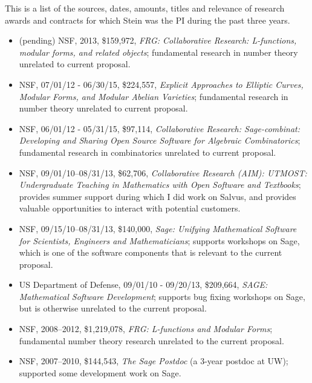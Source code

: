 \documentclass[11pt]{article}
\begin{document}
\mbox{}

This is a list of the sources, dates, amounts, titles and relevance of
research awards and contracts for which Stein was the PI during the
past three years.

\begin{itemize}\setlength{\itemsep}{0ex}

\item (pending) NSF, 2013, \$159,972, {\em FRG: Collaborative Research: L-functions, modular forms, and related objects}; fundamental research in number theory unrelated to current proposal.

\item NSF, 07/01/12 - 06/30/15, \$224,557, {\em Explicit Approaches to Elliptic Curves, Modular Forms, and Modular Abelian Varieties}; fundamental research in number theory unrelated to current proposal.
\item NSF, 06/01/12 - 05/31/15, \$97,114, {\em Collaborative Research: Sage-combinat: Developing and Sharing Open Source Software for Algebraic Combinatorics}; fundamental research in combinatorics unrelated to current proposal.
\item NSF, 09/01/10--08/31/13, \$62,706, {\em
  Collaborative Research (AIM): UTMOST: Undergraduate Teaching in
  Mathematics with Open Software and Textbooks}; provides summer support during which I did work on Salvus, and provides valuable opportunities to interact with potential customers.
\item NSF, 09/15/10--08/31/13, \$140,000, {\em Sage: Unifying Mathematical Software for Scientists, Engineers and Mathematicians}; supports workshops on Sage, which is one of the software components that is relevant to the current proposal.
\item US Department of Defense, 09/01/10 - 09/20/13, \$209,664, {\em
  SAGE: Mathematical Software Development}; supports bug fixing workshops on Sage, but is otherwise unrelated to the current proposal.
\item NSF, 2008--2012, \$1,219,078, {\em FRG: L-functions and Modular Forms}; fundamental number theory research unrelated to the current proposal.
\item NSF, 2007--2010, \$144,543, 
  {\em The Sage Postdoc} (a 3-year postdoc at UW); supported some development work on Sage.



\end{itemize}
\end{document}
